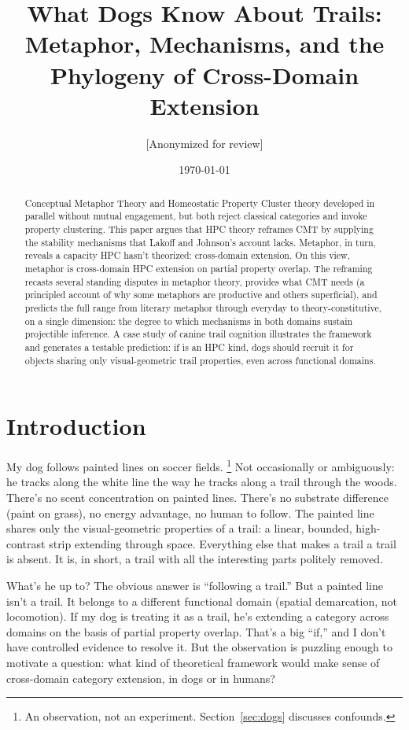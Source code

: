 \documentclass[12pt]{article}
\title{What Dogs Know About Trails:\\Metaphor, Mechanisms, and the Phylogeny of Cross-Domain Extension}
\author{[Anonymized for review]}
\date{\today}
\begin{document}
\maketitle

\begin{abstract}
 Conceptual Metaphor Theory and  Homeostatic Property Cluster theory developed in parallel without mutual engagement, but both reject classical categories and invoke property clustering. This paper argues that HPC theory reframes CMT by supplying the stability mechanisms that Lakoff and Johnson's account lacks. Metaphor, in turn, reveals a capacity HPC hasn't theorized: cross-domain extension. On this view, metaphor is cross-domain HPC extension on partial property overlap. The reframing recasts several standing disputes in metaphor theory, provides what CMT needs (a principled account of why some metaphors are productive and others superficial), and predicts the full range from literary metaphor through everyday to theory-constitutive, on a single dimension: the degree to which mechanisms in both domains sustain projectible inference. A case study of canine trail cognition illustrates the framework and generates a testable prediction: if  is an HPC kind, dogs should recruit it for objects sharing only visual-geometric trail properties, even across functional domains.
\end{abstract}

\section{Introduction}
\label{sec:intro}

My dog follows painted lines on soccer fields.%
\footnote{An observation, not an experiment. Section~\ref{sec:dogs} discusses confounds.} Not occasionally or ambiguously: he tracks along the white line the way he tracks along a trail through the woods. There's no scent concentration on painted lines. There's no substrate difference (paint on grass), no energy advantage, no human to follow. The painted line shares only the visual-geometric properties of a trail: a linear, bounded, high-contrast strip extending through space. Everything else that makes a trail a trail is absent. It is, in short, a trail with all the interesting parts politely removed.

What's he up to? The obvious answer is \enquote{following a trail.} But a painted line isn't a trail. It belongs to a different functional domain (spatial demarcation, not locomotion). If my dog is treating it as a trail, he's extending a category across domains on the basis of partial property overlap. That's a big \enquote{if,} and I don't have controlled evidence to resolve it. But the observation is puzzling enough to motivate a question: what kind of theoretical framework would make sense of cross-domain category extension, in dogs or in humans?
\end{document}
